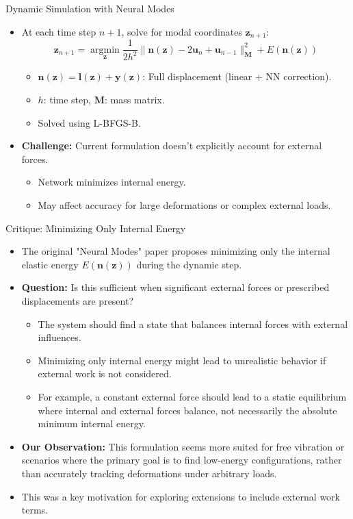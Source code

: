 \documentclass{beamer}
\DeclareMathOperator{\argmin}{argmin}
\begin{document}
\begin{frame}{Dynamic Simulation with Neural Modes}
    \begin{itemize}
        \item At each time step \(n+1\), solve for modal coordinates \(\bm{z}_{n+1}\):
        \begin{equation*}
            \bm{z}_{n+1} = \underset{\bm{z}}{\argmin} \frac{1}{2h^2} \|\bm{n}(\bm{z}) - 2\bm{u}_n + \bm{u}_{n-1}\|_{\bm{M}}^2 + E(\bm{n}(\bm{z}))
        \end{equation*}
        \begin{itemize}
            \item \(\bm{n}(\bm{z}) = \bm{l}(\bm{z}) + \bm{y}(\bm{z})\): Full displacement (linear + NN correction).
            \item \(h\): time step, \(\bm{M}\): mass matrix.
            \item Solved using L-BFGS-B.
        \end{itemize}
        \item \textbf{Challenge:} Current formulation doesn't explicitly account for external forces.
        \begin{itemize}
            \item Network minimizes internal energy.
            \item May affect accuracy for large deformations or complex external loads.
        \end{itemize}
    \end{itemize}
\end{frame}

\begin{frame}{Critique: Minimizing Only Internal Energy}
    \begin{itemize}
        \item The original "Neural Modes" paper proposes minimizing only the internal elastic energy \(E(\bm{n}(\bm{z}))\) during the dynamic step.
        \item \textbf{Question:} Is this sufficient when significant external forces or prescribed displacements are present?
        \begin{itemize}
            \item The system should find a state that balances internal forces with external influences.
            \item Minimizing only internal energy might lead to unrealistic behavior if external work is not considered.
            \item For example, a constant external force should lead to a static equilibrium where internal and external forces balance, not necessarily the absolute minimum internal energy.
        \end{itemize}
        \item \textbf{Our Observation:} This formulation seems more suited for free vibration or scenarios where the primary goal is to find low-energy configurations, rather than accurately tracking deformations under arbitrary loads.
        \item This was a key motivation for exploring extensions to include external work terms.
    \end{itemize}
\end{frame}
\end{document}

